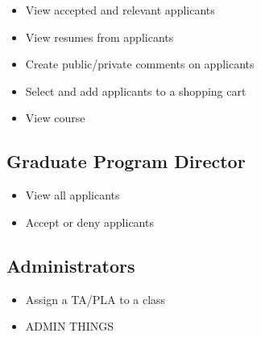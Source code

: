 \documentclass[11pt]{amsart}
\begin{document}
\begin{itemize}
    \item{View accepted and relevant applicants}
    \item{View resumes from applicants}
    \item{Create public/private comments on applicants}
    \item{Select and add applicants to a shopping cart}
    \item{View course}
\end{itemize}

\subsection{Graduate Program Director}

\begin{itemize}
    \item{View all applicants}
    \item{Accept or deny applicants}
\end{itemize}

\subsection{Administrators}

\begin{itemize}
    \item{Assign a TA/PLA to a class}
    \item{ADMIN THINGS}
\end{itemize}
\end{document}
